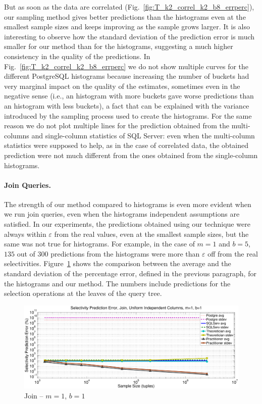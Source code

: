But as soon as the data are
correlated (Fig.~\ref{fig:T_k2_correl_k2_b8_errperc}), our sampling method gives better
predictions than the histograms even at the smallest sample sizes and keeps
improving as the sample grows larger. It is also interesting to observe how the
standard deviation of the prediction error is much smaller for our method than
for the histograms, suggesting a much higher consistency in the quality of the
predictions. In Fig.~\ref{fig:T_k2_correl_k2_b8_errperc} we do not show multiple
curves for the different PostgreSQL histograms because increasing the number of
buckets had very marginal impact on the quality of the estimates, sometimes even
in the negative sense (i.e., an histogram with more buckets gave worse
predictions than an histogram with less buckets), a fact that can be explained
with the variance introduced by the sampling process used to create the
histograms. For the same reason we do not plot multiple lines for the
prediction obtained from the multi-columns and single-column statistics of SQL
Server: even when the multi-column statistics were supposed to help, as in the
case of correlated data, the obtained prediction were not much different from
the ones obtained from the single-column histograms.

\paragraph{Join Queries.} The strength of our method compared to histograms is
even more evident when we run join queries, even when the histograms independent assumptions are
satisfied. In our experiments, the predictions obtained using our technique were
always within $\varepsilon$ from the real values, even at the smallest sample
sizes, but the same was not true for histograms. For example, in the case of
$m=1$ and $b=5$, $135$ out of $300$ predictions from the histograms were more
than $\varepsilon$ off from the real selectivities.
Figure~\ref{fig:join_k1_b1_errperc} shows the comparison between the average and
the standard deviation of the percentage error, defined in the previous
paragraph, for the histograms and our method. The numbers include predictions
for the selection operations at the leaves of the query tree.

\begin{figure}[ht]
  \centering
  \includegraphics[scale=0.35]{vcfreq/join_k1_b1_errperc}
  \caption{Join -- $m=1$, $b=1$}
  \label{fig:join_k1_b1_errperc}
\end{figure}

